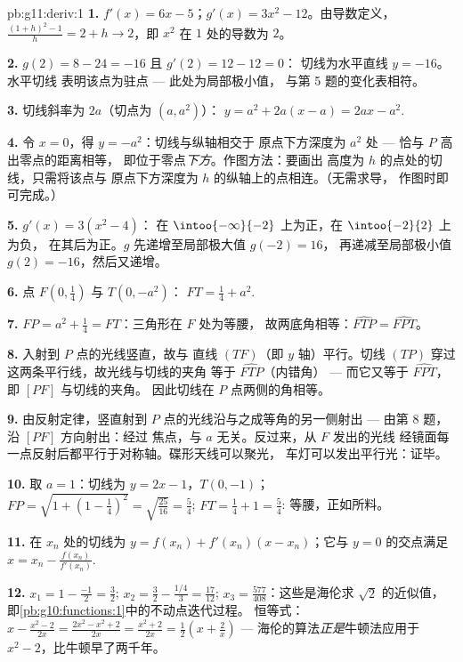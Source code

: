 \begin{solution}{pb:g11:deriv:1}
\textbf{1.} $f'(x) = 6x - 5$；$g'(x) = 3x^2 - 12$。由导数定义，
$\frac{(1 + h)^2 - 1}{h} = 2 + h \to 2$，即
$x^2$ 在 $1$ 处的导数为 $2$。

\textbf{2.} $g(2) = 8 - 24 = -16$ 且 $g'(2) = 12 - 12 = 0$：
切线为水平直线 $y = -16$。水平切线
表明该点为驻点 --- 此处为局部极小值，
与第 5 题的变化表相符。

\textbf{3.} 切线斜率为 $2a$（切点为 $(a, a^2)$）：
$y = a^2 + 2a(x - a) = 2ax - a^2$.

\textbf{4.} 令 $x = 0$，得 $y = -a^2$：切线与纵轴相交于
原点下方深度为 $a^2$ 处 --- 恰与 $P$ 高出零点的距离相等，
即位于零点\emph{下方}。作图方法：要画出
高度为 $h$ 的点处的切线，只需将该点与
原点下方深度为 $h$ 的纵轴上的点相连。（无需求导，
作图时即可完成。）

\textbf{5.} $g'(x) = 3(x^2 - 4)$：
在 $\intoo{-\infty}{-2}$ 上为正，在 $\intoo{-2}{2}$ 上为负，
在其后为正。$g$ 先递增至局部极大值 $g(-2) = 16$，
再递减至局部极小值 $g(2) = -16$，然后又递增。

\textbf{6.} 点 $F\left(0, \frac14\right)$ 与 $T(0, -a^2)$：
$FT = \frac14 + a^2$.

\textbf{7.} $FP = a^2 + \frac14 = FT$：三角形在 $F$ 处为等腰，
故两底角相等：$\widehat{FTP} = \widehat{FPT}$。

\textbf{8.} 入射到 $P$ 点的光线竖直，故与
直线 $(TF)$（即 $y$ 轴）平行。切线 $(TP)$ 穿过
这两条平行线，故光线与切线的夹角
等于 $\widehat{FTP}$（内错角） --- 而它又等于
$\widehat{FPT}$，即 $[PF]$ 与切线的夹角。
因此切线在 $P$ 点两侧的角相等。

\textbf{9.} 由反射定律，竖直射到
$P$ 点的光线沿与之成等角的另一侧射出 ---
由第 8 题，沿 $[PF]$ 方向射出：经过
焦点，与 $a$ 无关。反过来，从 $F$ 发出的光线
经镜面每一点反射后都平行于对称轴。碟形天线可以聚光，
车灯可以发出平行光：证毕。

\textbf{10.} 取 $a = 1$：切线为 $y = 2x - 1$，$T(0, -1)$；
$FP = \sqrt{1 + \left(1 - \frac14\right)^2} =
\sqrt{\frac{25}{16}} = \frac54$; $FT = \frac14 + 1 = \frac54$:
等腰，正如所料。

\textbf{11.} 在 $x_n$ 处的切线为
$y = f(x_n) + f'(x_n)(x - x_n)$；它与 $y = 0$ 的交点满足
$x = x_n - \frac{f(x_n)}{f'(x_n)}$.

\textbf{12.} $x_1 = 1 - \frac{-1}{2} = \frac32$;
$x_2 = \frac32 - \frac{1/4}{3} = \frac{17}{12}$;
$x_3 = \frac{577}{408}$：这些是海伦求 $\sqrt2$ 的近似值，
即\cref{pb:g10:functions:1}中的不动点迭代过程。
恒等式：$x - \frac{x^2 - 2}{2x} = \frac{2x^2 - x^2 + 2}{2x}
= \frac{x^2 + 2}{2x} = \frac12\left(x + \frac2x\right)$ ---
海伦的算法\emph{正是}牛顿法应用于
$x^2 - 2$，比牛顿早了两千年。


\end{solution}
